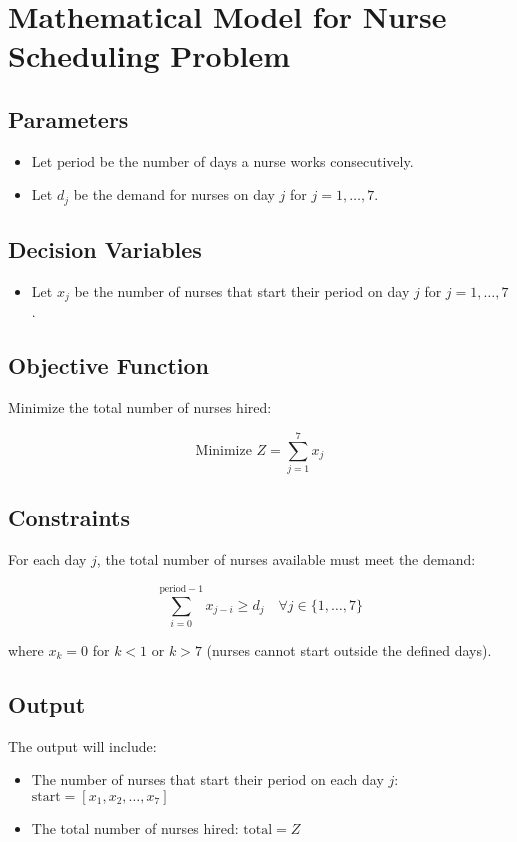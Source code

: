 \documentclass{article}
\begin{document}
\section*{Mathematical Model for Nurse Scheduling Problem}

\subsection*{Parameters}
\begin{itemize}
    \item Let \( \text{period} \) be the number of days a nurse works consecutively.
    \item Let \( d_j \) be the demand for nurses on day \( j \) for \( j = 1, \ldots, 7 \).
\end{itemize}

\subsection*{Decision Variables}
\begin{itemize}
    \item Let \( x_j \) be the number of nurses that start their period on day \( j \) for \( j = 1, \ldots, 7 \).
\end{itemize}

\subsection*{Objective Function}
Minimize the total number of nurses hired:

\[
\text{Minimize } Z = \sum_{j=1}^{7} x_j
\]

\subsection*{Constraints}
For each day \( j \), the total number of nurses available must meet the demand:

\[
\sum_{i=0}^{\text{period}-1} x_{j-i} \geq d_j \quad \forall j \in \{1, \ldots, 7\}
\]

where \( x_k = 0 \) for \( k < 1 \) or \( k > 7 \) (nurses cannot start outside the defined days).

\subsection*{Output}
The output will include:
\begin{itemize}
    \item The number of nurses that start their period on each day \( j \): \( \text{start} = [x_1, x_2, \ldots, x_7] \)
    \item The total number of nurses hired: \( \text{total} = Z \)
\end{itemize}
\end{document}

